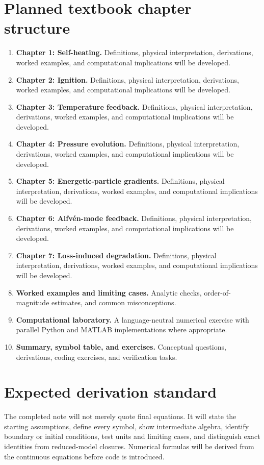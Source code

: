 \documentclass[11pt]{article}
\begin{document}
\section{Planned textbook chapter structure}
\begin{enumerate}[leftmargin=1.8em]
\item \textbf{Chapter 1: Self-heating.} Definitions, physical interpretation, derivations, worked examples, and computational implications will be developed.
\item \textbf{Chapter 2: Ignition.} Definitions, physical interpretation, derivations, worked examples, and computational implications will be developed.
\item \textbf{Chapter 3: Temperature feedback.} Definitions, physical interpretation, derivations, worked examples, and computational implications will be developed.
\item \textbf{Chapter 4: Pressure evolution.} Definitions, physical interpretation, derivations, worked examples, and computational implications will be developed.
\item \textbf{Chapter 5: Energetic-particle gradients.} Definitions, physical interpretation, derivations, worked examples, and computational implications will be developed.
\item \textbf{Chapter 6: Alfv\'en-mode feedback.} Definitions, physical interpretation, derivations, worked examples, and computational implications will be developed.
\item \textbf{Chapter 7: Loss-induced degradation.} Definitions, physical interpretation, derivations, worked examples, and computational implications will be developed.
\item \textbf{Worked examples and limiting cases.} Analytic checks, order-of-magnitude estimates, and common misconceptions.
\item \textbf{Computational laboratory.} A language-neutral numerical exercise with parallel Python and MATLAB implementations where appropriate.
\item \textbf{Summary, symbol table, and exercises.} Conceptual questions, derivations, coding exercises, and verification tasks.
\end{enumerate}

\section{Expected derivation standard}
The completed note will not merely quote final equations. It will state the starting assumptions, define every symbol, show intermediate algebra, identify boundary or initial conditions, test units and limiting cases, and distinguish exact identities from reduced-model closures. Numerical formulas will be derived from the continuous equations before code is introduced.
\end{document}
